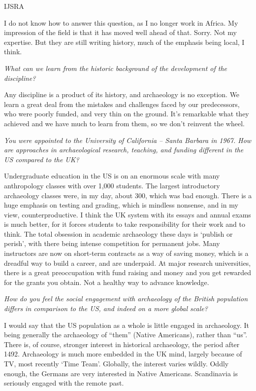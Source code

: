 \begin{labeling}{IJSRA}
\item[BMF] I do not know how to answer this question, as I no longer work in Africa. My impression of the field is that it has moved well ahead of that. Sorry. Not my expertise. But they are still writing history, much of the emphasis being local, I think.

\item[IJSRA] \textit{What can we learn from the historic background of the development of the discipline?}

\item[BMF] Any discipline is a product of its history, and archaeology is no exception. We learn a great deal from the mistakes and challenges faced by our predecessors, who were poorly funded, and very thin on the ground. It’s remarkable what they achieved and we have much to learn from them, so we don’t reinvent the wheel.

\item[IJSRA] \textit{You were appointed to the University of California – Santa Barbara in 1967. How are approaches in archaeological research, teaching, and funding different in the US compared to the UK?}

\item[BMF] Undergraduate education in the US is on an enormous scale with many anthropology classes with over 1,000 students. The largest introductory archaeology classes were, in my day, about 300, which was bad enough. There is a huge emphasis on testing and grading, which is mindless nonsense, and in my view, counterproductive. I think the UK system with its essays and annual exams is much better, for it forces students to take responsibility for their work and to think. The total obsession in academic archaeology these days is ‘publish or perish’, with there being intense competition for permanent jobs. Many instructors are now on short-term contracts as a way of saving money, which is a dreadful way to build a career, and are underpaid. At major research universities, there is a great preoccupation with fund raising and money and you get rewarded for the grants you obtain. Not a healthy way to advance knowledge.

\item[IJSRA] \textit{How do you feel the social engagement with archaeology of the British population differs in comparison to the US, and indeed on a more global scale?}
	
\item[BMF] I would say that the US population as a whole is little engaged in archaeology. It being generally the archaeology of “them” (Native Americans), rather than “us”. There is, of course, stronger interest in historical archaeology, the period after 1492. Archaeology is much more embedded in the UK mind, largely because of TV, most recently ‘Time Team’. Globally, the interest varies wildly. Oddly enough, the Germans are very interested in Native Americans. Scandinavia is seriously engaged with the remote past.
	

\end{labeling}

